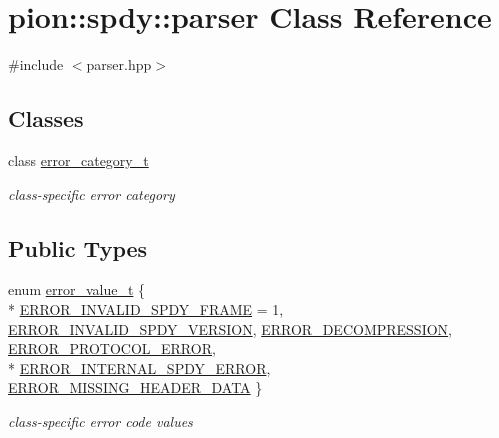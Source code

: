 \hypertarget{classpion_1_1spdy_1_1parser}{\section{pion\-:\-:spdy\-:\-:parser Class Reference}
\label{classpion_1_1spdy_1_1parser}
}


{\ttfamily \#include $<$parser.\-hpp$>$}

\subsection*{Classes}
\begin{DoxyCompactItemize}
\item 
class \hyperlink{classpion_1_1spdy_1_1parser_1_1error__category__t}{error\-\_\-category\-\_\-t}
\begin{DoxyCompactList}\small\item\em class-\/specific error category \end{DoxyCompactList}\end{DoxyCompactItemize}
\subsection*{Public Types}
\begin{DoxyCompactItemize}
\item 
enum \hyperlink{classpion_1_1spdy_1_1parser_abaab54ece6835d5763900809a1d6915b}{error\-\_\-value\-\_\-t} \{ \\*
\hyperlink{classpion_1_1spdy_1_1parser_abaab54ece6835d5763900809a1d6915bafb4a6ca9230ef0cb91b5a13b4b3034ab}{E\-R\-R\-O\-R\-\_\-\-I\-N\-V\-A\-L\-I\-D\-\_\-\-S\-P\-D\-Y\-\_\-\-F\-R\-A\-M\-E} = 1, 
\hyperlink{classpion_1_1spdy_1_1parser_abaab54ece6835d5763900809a1d6915bab49a657c0123e1417d65286595ee68f0}{E\-R\-R\-O\-R\-\_\-\-I\-N\-V\-A\-L\-I\-D\-\_\-\-S\-P\-D\-Y\-\_\-\-V\-E\-R\-S\-I\-O\-N}, 
\hyperlink{classpion_1_1spdy_1_1parser_abaab54ece6835d5763900809a1d6915ba3fc66c17eb78b99779ab5453dd459596}{E\-R\-R\-O\-R\-\_\-\-D\-E\-C\-O\-M\-P\-R\-E\-S\-S\-I\-O\-N}, 
\hyperlink{classpion_1_1spdy_1_1parser_abaab54ece6835d5763900809a1d6915ba093135ad8a939be1a8533bd244e19966}{E\-R\-R\-O\-R\-\_\-\-P\-R\-O\-T\-O\-C\-O\-L\-\_\-\-E\-R\-R\-O\-R}, 
\\*
\hyperlink{classpion_1_1spdy_1_1parser_abaab54ece6835d5763900809a1d6915ba1108f301042c4a8fa94be64f61b7a404}{E\-R\-R\-O\-R\-\_\-\-I\-N\-T\-E\-R\-N\-A\-L\-\_\-\-S\-P\-D\-Y\-\_\-\-E\-R\-R\-O\-R}, 
\hyperlink{classpion_1_1spdy_1_1parser_abaab54ece6835d5763900809a1d6915ba5c4984c41fd05b4b70fa3491cb663cd7}{E\-R\-R\-O\-R\-\_\-\-M\-I\-S\-S\-I\-N\-G\-\_\-\-H\-E\-A\-D\-E\-R\-\_\-\-D\-A\-T\-A}
 \}
\begin{DoxyCompactList}\small\item\em class-\/specific error code values \end{DoxyCompactList}\end{DoxyCompactItemize}
